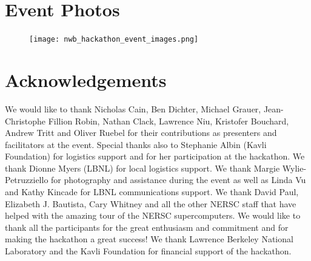 \documentclass{article}
\begin{document}


\clearpage
\section{Event Photos}
\begin{figure}[h!]
\texttt{[image: nwb\_hackathon\_event\_images.png]}
\end{figure}

\clearpage
\section*{Acknowledgements}
\label{sec:ack}

We would like to thank Nicholas Cain, Ben Dichter, Michael Grauer, Jean-Christophe Fillion Robin,
Nathan Clack, Lawrence Niu, Kristofer Bouchard, Andrew Tritt and Oliver Ruebel for their
contributions as presenters and facilitators at the event. Special thanks also to 
Stephanie Albin (Kavli Foundation) for logistics support and for her participation at the hackathon.
We thank Dionne Myers (LBNL) for local logistics support. We thank Margie Wylie-Petruzziello
for photography and assistance during the event as well as Linda Vu and Kathy Kincade for
LBNL communications support.
We thank David Paul, Elizabeth J. Bautista, Cary Whitney and all the other NERSC staff 
that have helped with the amazing tour of the NERSC supercomputers. 
We would like to thank all the participants for the great enthusiasm and commitment and
for making the hackathon a great success! We thank Lawrence Berkeley National Laboratory 
and the Kavli Foundation for financial support of the hackathon. 
\end{document}
